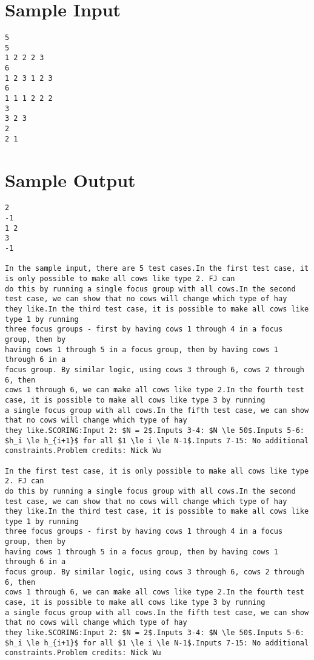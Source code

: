 \documentclass[12pt]{article}
\begin{document}
\section*{Sample Input}
\begin{verbatim}
5
5
1 2 2 2 3
6
1 2 3 1 2 3
6
1 1 1 2 2 2
3
3 2 3
2
2 1
\end{verbatim}

\section*{Sample Output}
\begin{verbatim}
2
-1
1 2
3
-1

In the sample input, there are 5 test cases.In the first test case, it is only possible to make all cows like type 2. FJ can
do this by running a single focus group with all cows.In the second test case, we can show that no cows will change which type of hay
they like.In the third test case, it is possible to make all cows like type 1 by running
three focus groups - first by having cows 1 through 4 in a focus group, then by
having cows 1 through 5 in a focus group, then by having cows 1 through 6 in a
focus group. By similar logic, using cows 3 through 6, cows 2 through 6, then
cows 1 through 6, we can make all cows like type 2.In the fourth test case, it is possible to make all cows like type 3 by running
a single focus group with all cows.In the fifth test case, we can show that no cows will change which type of hay
they like.SCORING:Input 2: $N = 2$.Inputs 3-4: $N \le 50$.Inputs 5-6: $h_i \le h_{i+1}$ for all $1 \le i \le N-1$.Inputs 7-15: No additional constraints.Problem credits: Nick Wu

In the first test case, it is only possible to make all cows like type 2. FJ can
do this by running a single focus group with all cows.In the second test case, we can show that no cows will change which type of hay
they like.In the third test case, it is possible to make all cows like type 1 by running
three focus groups - first by having cows 1 through 4 in a focus group, then by
having cows 1 through 5 in a focus group, then by having cows 1 through 6 in a
focus group. By similar logic, using cows 3 through 6, cows 2 through 6, then
cows 1 through 6, we can make all cows like type 2.In the fourth test case, it is possible to make all cows like type 3 by running
a single focus group with all cows.In the fifth test case, we can show that no cows will change which type of hay
they like.SCORING:Input 2: $N = 2$.Inputs 3-4: $N \le 50$.Inputs 5-6: $h_i \le h_{i+1}$ for all $1 \le i \le N-1$.Inputs 7-15: No additional constraints.Problem credits: Nick Wu


\end{verbatim}
\end{document}
